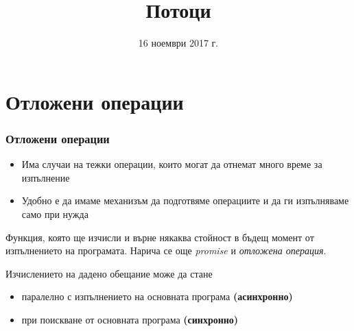 \documentclass{beamer}
\title{Потоци}
\date{16 ноември 2017 г.}
\begin{document}
\begin{frame}
  \titlepage
\end{frame}

\section{Отложени операции}

\begin{frame}
  \frametitle{Отложени операции}

  \begin{itemize}[<+->]
  \item Има случаи на тежки операции, които могат да отнемат много време за изпълнение
  \item Удобно е да имаме механизъм да \alert{подготвяме} операциите и да ги \alert{изпълняваме} само при нужда
  \end{itemize}
  \onslide<+->
  \begin{definition}[Обещание]
    Функция, която ще изчисли и върне някаква стойност в бъдещ момент от изпълнението на програмата.
    \onslide<+->
    Нарича се още \emph{promise} и \emph{отложена операция}.
  \end{definition}
  \onslide<+->
  Изчислението на дадено обещание може да стане
  \begin{itemize}[<+->]
  \item паралелно с изпълнението на основната програма \textbf{(асинхронно)}
  \item при поискване от основната програма \textbf{(синхронно)}
  \end{itemize}
\end{frame}
\end{document}

